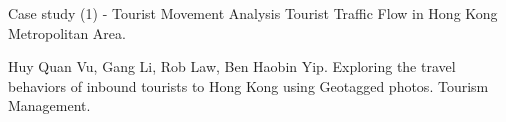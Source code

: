 \documentclass[
 size=14pt,
 paper=smartboard,  %
 mode=present, 		%
 display=slides, 	%
 style=tuliplab,  	%
 pauseslide,
 fleqn,leqno]{powerdot}
\begin{document}
\begin{slide}[toc=,bm=]{Case study (1) - Tourist Movement Analysis}
Tourist Traffic Flow in Hong Kong Metropolitan Area.

\begin{figure}[htbp]
\end{figure}
\begin{thebibliography}{}
\bibitem{}
\small{Huy Quan Vu, Gang Li, Rob Law, Ben Haobin Yip.
Exploring the travel behaviors of inbound tourists to Hong Kong using Geotagged photos.
Tourism Management.}
\end{thebibliography}
\end{slide}


%
%
\end{document}
